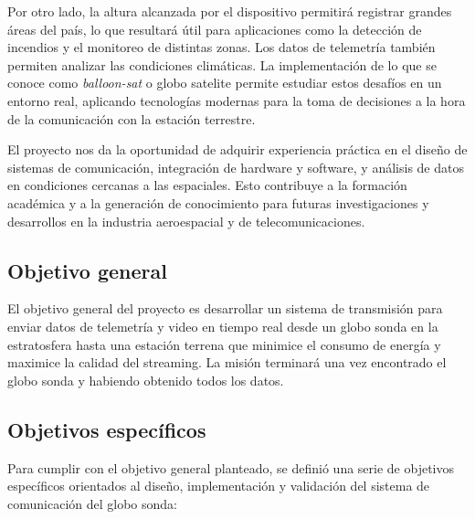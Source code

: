 \documentclass[12pt,a4paper]{article}
\begin{document}
Por otro lado, la altura alcanzada por el dispositivo permitirá registrar grandes áreas del país, lo que resultará útil para aplicaciones como la detección de incendios y el monitoreo de distintas zonas. Los datos de telemetría también permiten analizar las condiciones climáticas. La implementación de lo que se conoce como \textit{balloon-sat} o globo satelite permite estudiar estos desafíos en un entorno real, aplicando tecnologías modernas para la toma de decisiones a la hora de la comunicación con la estación terrestre.

El proyecto nos da la oportunidad de adquirir experiencia práctica en el diseño de sistemas de comunicación, integración de hardware y software, y análisis de datos en condiciones cercanas a las espaciales. Esto contribuye a la formación académica y a la generación de conocimiento para futuras investigaciones y desarrollos en la industria aeroespacial y de telecomunicaciones.

\subsection{Objetivo general}\label{objetivo-general}

El objetivo general del proyecto es desarrollar un sistema de transmisión para enviar datos de telemetría y video en tiempo real desde un globo sonda en la estratosfera hasta una estación terrena que minimice el consumo de energía y maximice la calidad del streaming. La misión terminará una vez encontrado el globo sonda y habiendo obtenido todos los datos.

\subsection{Objetivos específicos}\label{objetivos-especificos}

Para cumplir con el objetivo general planteado, se definió una serie de objetivos específicos orientados al diseño, implementación y validación del sistema de comunicación del globo sonda:
\end{document}
